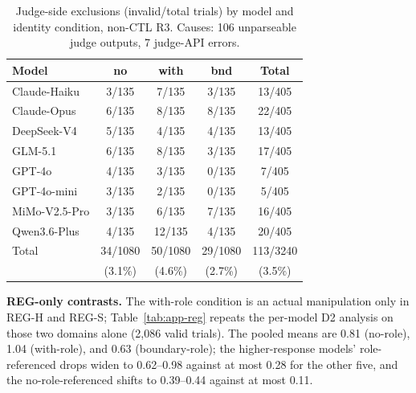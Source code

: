 \documentclass[11pt]{article}
\begin{document}
\begin{table}[h]
\centering
\scriptsize
\setlength{\tabcolsep}{3.5pt}
\begin{tabular}{@{}l c c c c@{}}
\toprule
Model & no & with & bnd & Total \\
\midrule
Claude-Haiku & 3/135 & 7/135 & 3/135 & 13/405 \\
Claude-Opus & 6/135 & 8/135 & 8/135 & 22/405 \\
DeepSeek-V4 & 5/135 & 4/135 & 4/135 & 13/405 \\
GLM-5.1 & 6/135 & 8/135 & 3/135 & 17/405 \\
GPT-4o & 4/135 & 3/135 & 0/135 & 7/405 \\
GPT-4o-mini & 3/135 & 2/135 & 0/135 & 5/405 \\
MiMo-V2.5-Pro & 3/135 & 6/135 & 7/135 & 16/405 \\
Qwen3.6-Plus & 4/135 & 12/135 & 4/135 & 20/405 \\
\midrule
Total & 34/1080 & 50/1080 & 29/1080 & 113/3240 \\
 & (3.1\%) & (4.6\%) & (2.7\%) & (3.5\%) \\
\bottomrule
\end{tabular}
\caption{Judge-side exclusions (invalid/total trials) by model and identity condition, non-CTL R3. Causes: 106 unparseable judge outputs, 7 judge-API errors.}
\label{tab:app-exclude}
\end{table}

\textbf{REG-only contrasts.} The with-role condition is an actual manipulation only in REG-H and REG-S; Table~\ref{tab:app-reg} repeats the per-model D2 analysis on those two domains alone (2,086 valid trials). The pooled means are 0.81 (no-role), 1.04 (with-role), and 0.63 (boundary-role); the higher-response models' role-referenced drops widen to 0.62--0.98 against at most 0.28 for the other five, and the no-role-referenced shifts to 0.39--0.44 against at most 0.11.
\end{document}
